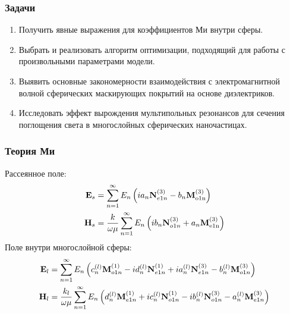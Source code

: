 \documentclass[14pt]{beamer}
\begin{document}
\begin{frame}
  \frametitle{Задачи}
  \small
  \begin{enumerate} %
  \item Получить явные выражения для коэффициентов Ми внутри сферы.
  \item Выбрать и реализовать алгоритм оптимизации, подходящий для
    работы с произвольными параметрами модели.%
  \item Выявить основные закономерности взаимодействия с
    электромагнитной волной сферических маскирующих покрытий на
    основе диэлектриков.
  \item Исследовать эффект  вырождения мультипольных
    резонансов для сечения поглощения  света в многослойных
    сферических наночастицах.
  \end{enumerate}
  
\end{frame}

\begin{frame}
  \frametitle{Теория Ми}
  \small
  Рассеянное поле:
  \begin{align*}
{\rm  \mathbf{E}}_s &=\sum_{n=1}^{\infty} E_n \left( i a_n {\rm 
    \mathbf{N}}_{e1n}^{(3)} - b_n{\rm \mathbf{M}_{o1n}^{(3)}} \right)\\
{\rm  \mathbf{H}}_s &=\frac{k}{\omega\mu}
 \sum_{n=1}^{\infty} E_n \left( i b_n {\rm 
    \mathbf{N}}_{o1n}^{(3)} + a_n{\rm \mathbf{M}_{e1n}^{(3)}} \right)  
\end{align*}
  Поле внутри многослойной сферы:
\begin{align*}
{\rm  \mathbf{E}}_l &=\sum_{n=1}^{\infty} E_n \left(
                     c_n^{(l)}{\rm \mathbf{M}}_{o1n}^{(1)}
                     -i d_n^{(l)} {\rm  \mathbf{N}}_{e1n}^{(1)}
                     +i a_n^{(l)} {\rm  \mathbf{N}}_{e1n}^{(3)}
                     - b_n^{(l)}{\rm \mathbf{M}}_{o1n}^{(3)} 
                     \right)\label{eq:3p1}\\
{\rm  \mathbf{H}}_l &=\frac{k_l}{\omega\mu} \sum_{n=1}^{\infty} E_n
                     \left(
                      d_n^{(l)}{\rm \mathbf{M}}_{e1n}^{(1)} 
                     +i c_n^{(l)} {\rm  \mathbf{N}}_{o1n}^{(1)} 
                     -i b_n^{(l)} {\rm  \mathbf{N}}_{o1n}^{(3)} 
                     - a_n^{(l)}{\rm \mathbf{M}}_{e1n}^{(3)} 
                     \right)
\end{align*}
\end{frame}
\end{document}
